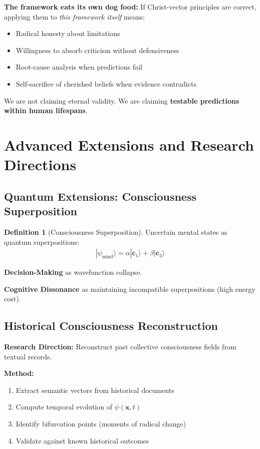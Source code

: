 \documentclass[11pt,a4paper]{article}
\theoremstyle{definition}
\newtheorem{definition}{Definition}[section]
\theoremstyle{remark}
\newcommand{\cc}{\mathbf{c}}
\begin{document}
\begin{small}
\begin{mdframed}[backgroundcolor=green!5]
\textbf{The framework eats its own dog food:} If Christ-vector principles are correct, applying them to \textit{this framework itself} means:
\begin{itemize}
\item Radical honesty about limitations
\item Willingness to absorb criticism without defensiveness  
\item Root-cause analysis when predictions fail
\item Self-sacrifice of cherished beliefs when evidence contradicts
\end{itemize}

We are not claiming eternal validity. We are claiming \textbf{testable predictions within human lifespans}.
\end{mdframed}

\section{Advanced Extensions and Research Directions}

\subsection{Quantum Extensions: Consciousness Superposition}

\begin{definition}[Consciousness Superposition]
Uncertain mental states as quantum superpositions:
\begin{align}
|\psi_{\text{mind}}\rangle = \alpha |\cc_1\rangle + \beta |\cc_2\rangle
\end{align}

\textbf{Decision-Making} as wavefunction collapse.

\textbf{Cognitive Dissonance} as maintaining incompatible superpositions (high energy cost).
\end{definition}

\subsection{Historical Consciousness Reconstruction}

\textbf{Research Direction:} Reconstruct past collective consciousness fields from textual records.

\textbf{Method:}
\begin{enumerate}
\item Extract semantic vectors from historical documents
\item Compute temporal evolution of $\psi(\mathbf{x}, t)$
\item Identify bifurcation points (moments of radical change)
\item Validate against known historical outcomes
\end{enumerate}


\end{small}
\end{document}
